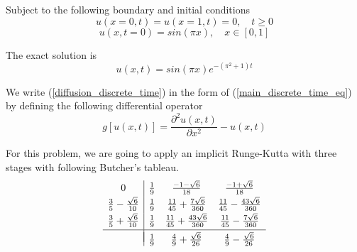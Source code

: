 \documentclass[a4paper, onecolumn, 12pt]{article}
\begin{document}
Subject to the following boundary and initial conditions
\begin{equation}
u(x = 0, t) = u(x= 1, t) = 0, \quad t \ge 0
\end{equation}
\begin{equation}
u(x, t=0) = sin(\pi x), \quad x \in [0, 1] 
\end{equation}

The exact solution is 
\begin{equation}
u(x,t) = sin(\pi x) e^{-(\pi^2 + 1)t}
\end{equation}

We write (\ref{diffusion_discrete_time}) in the form of (\ref{main_discrete_time_eq}) 
by defining the following differential operator
\begin{equation}
g[u(x,t)] = \frac{\partial^2 u(x,t)}{\partial x^2} - u(x, t)
\end{equation}

For this problem, we are going to apply an implicit Runge-Kutta with three stages with following
Butcher's tableau.
\begin{equation}
\begin{array}{c|ccc}
    0 & \frac{1}{9} &  \frac{-1-\sqrt{6}}{18} &  
    \frac{-1+\sqrt{6}}{18}\\[0.25em]
    \frac{3}{5} - \frac{\sqrt{6}}{10} & \frac{1}{9} & \frac{11}{45} + 
    \frac{7\sqrt{6}}{360} & \frac{11}{45} - \frac{43\sqrt{6}}{360} \\[0.25em]
    \frac{3}{5} + \frac{\sqrt{6}}{10} & \frac{1}{9} &
    \frac{11}{45} + \frac{43\sqrt{6}}{360} & \frac{11}{45} - \frac{7\sqrt{6}}{360}\\[0.25em]
    \hline \\[-1em]
    & \frac{1}{9} & \frac{4}{9} + \frac{\sqrt{6}}{26} &
    \frac{4}{9} - \frac{\sqrt{6}}{26}
    \end{array}
\end{equation}
\end{document}
